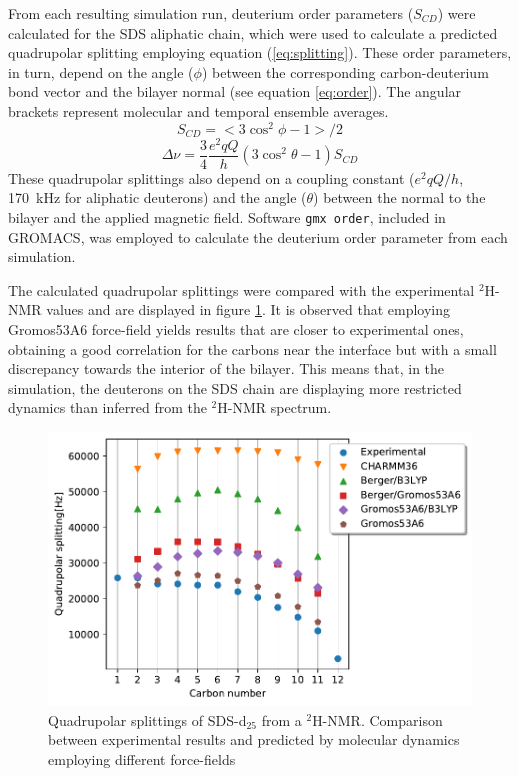 \documentclass[3p,preprint,review]{elsarticle}
\begin{document}
	From each resulting simulation run, deuterium order parameters ($S_{CD}$) were
	calculated for the SDS aliphatic chain, which were used to calculate a
	predicted
	quadrupolar splitting employing equation (\ref{eq:splitting}). These order parameters, in turn, depend on the angle ($\phi$) between the corresponding carbon-deuterium bond vector and the bilayer normal (see equation \ref{eq:order}). The angular brackets represent molecular and temporal ensemble averages.
	\begin{equation}
	\label{eq:order}
	S_{CD} = <3 \cos^2\phi -1>/2
	\end{equation}
	\begin{equation}
	\label{eq:splitting}
	\Delta\nu = \frac{3}{4} \frac{e^2qQ}{h}(3\cos^2\theta - 1) S_{CD}
	\end{equation}
	These
	quadrupolar splittings also depend on
	a
	coupling constant ($e^2qQ/h$, \SI{170}{kHz} for aliphatic
	deuterons\cite{Davis1983}) and the angle ($\theta$) between the normal to the
	bilayer and the
	applied magnetic field. Software \texttt{gmx order}, included in GROMACS, was
	employed to calculate the deuterium order parameter from each simulation.
	

	
	The calculated quadrupolar splittings were compared with the experimental
	$^2$H-NMR values and are
	displayed in figure \ref{fig:calibration}. It is observed that employing
	Gromos53A6 force-field yields results that are closer to experimental ones,
	obtaining a good correlation for the carbons
	near the interface but with a small discrepancy towards the interior of the
	bilayer. This means that, in the simulation, the deuterons on the SDS chain are
	displaying more
	restricted dynamics than inferred from the $^2$H-NMR spectrum.
	
	\begin{figure}[h]
		\centering
		\includegraphics[width=\columnwidth]{calibration}
		\caption{Quadrupolar splittings of SDS-d$_{25}$ from a $^2$H-NMR. Comparison
			between experimental results and predicted by molecular dynamics employing
			different force-fields}
		\label{fig:calibration}
	\end{figure}
	
\end{document}
